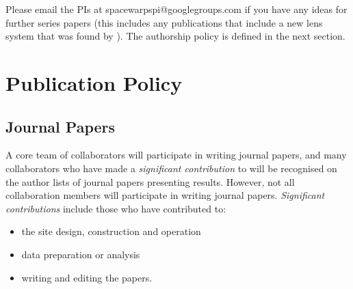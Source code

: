 \documentclass[a4paper]{article}
\begin{document}
Please email the \sw PIs at spacewarpspi@googlegroups.com if you have any
ideas for further \sw series papers (this includes any publications that
include a new lens system that was found by \sw). The authorship policy is
defined in the next section.



\section{Publication Policy}
\label{sec:publ}

\subsection{Journal Papers}
\label{sec:series}

A core team of collaborators will participate in writing journal papers, and
many collaborators who have made a \textit{significant contribution} to \sw
will be recognised on the author lists of journal papers presenting \sw
results.  However, not all collaboration members will participate in writing
journal papers.  \textit{Significant contributions} include those who have
contributed to:
\begin{itemize}
\item the site design, construction and operation
\item data preparation or analysis
\item writing and editing the papers. 
\end{itemize}


\end{document}

